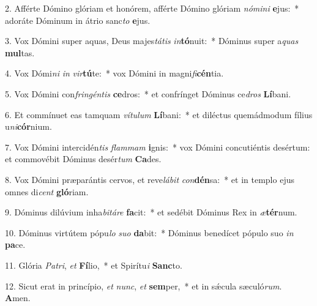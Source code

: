 2. Afférte Dómino glóriam et honórem, afférte Dómino glóriam \textit{nó}\textit{mi}\textit{ni} \textbf{e}jus:~*  adoráte Dóminum in átrio sanc\textit{to} \textbf{e}jus.\

3. Vox Dómini super aquas, Deus majes\textit{tá}\textit{tis} \textit{in}\textbf{tó}nuit:~*  Dóminus super a\textit{quas} \textbf{mul}tas.\

4. Vox Dómi\textit{ni} \textit{in} \textit{vir}\textbf{tú}te:~*  vox Dómini in magni\textit{fi}\textbf{cén}tia.\

5. Vox Dómini con\textit{frin}\textit{gén}\textit{tis} \textbf{ce}dros:~*  et confrínget Dóminus ce\textit{dros} \textbf{Lí}bani.\

6. Et commínuet eas tamquam \textit{ví}\textit{tu}\textit{lum} \textbf{Lí}bani:~*  et diléctus quemádmodum fílius u\textit{ni}\textbf{cór}nium.\

7. Vox Dómini intercidén\textit{tis} \textit{flam}\textit{mam} \textbf{i}gnis:~*  vox Dómini concutiéntis desértum: et commovébit Dóminus desér\textit{tum} \textbf{Ca}des.\

8. Vox Dómini præparántis cervos, et reve\textit{lá}\textit{bit} \textit{con}\textbf{dén}sa:~*  et in templo ejus omnes di\textit{cent} \textbf{gló}riam.\

9. Dóminus dilúvium inha\textit{bi}\textit{tá}\textit{re} \textbf{fa}cit:~*  et sedébit Dóminus Rex in \textit{æ}\textbf{tér}num.\

10. Dóminus virtútem pópu\textit{lo} \textit{su}\textit{o} \textbf{da}bit:~*  Dóminus benedícet pópulo suo \textit{in} \textbf{pa}ce.\

11. Glória \textit{Pa}\textit{tri}, \textit{et} \textbf{Fí}lio,~*  et Spirítu\textit{i} \textbf{Sanc}to.\

12. Sicut erat in princípio, \textit{et} \textit{nunc}, \textit{et} \textbf{sem}per,~*  et in sǽcula sæculó\textit{rum}. \textbf{A}men.\

